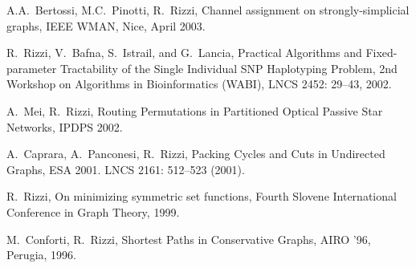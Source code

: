 \begin{etaremune}
\vspace{-1.8mm}
  \item {A.A.~Bertossi, M.C.~Pinotti, R.~Rizzi},
   \newblock Channel assignment on strongly-simplicial graphs,
   \newblock IEEE WMAN,
   \newblock Nice, April 2003.

\vspace{-1.8mm}
  \item {R.~Rizzi, V.~Bafna, S.~Istrail, and G.~Lancia},
   \newblock Practical Algorithms and Fixed-parameter Tractability
   \newblock of the Single Individual SNP Haplotyping Problem,
   \newblock 2nd Workshop on Algorithms in Bioinformatics (WABI),
   \newblock LNCS 2452: 29--43, 2002.

\vspace{-1.8mm}
  \item {A.~Mei, R.~Rizzi},
   \newblock Routing Permutations in Partitioned Optical Passive Star Networks,
   \newblock IPDPS 2002.

\vspace{-1.8mm}
  \item {A.~Caprara, A.~Panconesi, R.~Rizzi},
   \newblock  Packing Cycles and Cuts in Undirected Graphs,
   \newblock ESA 2001.
   \newblock LNCS 2161: 512--523 (2001).

\vspace{-1.8mm}
  \item {R.~Rizzi},
   \newblock On minimizing symmetric set functions,
   \newblock Fourth Slovene International Conference
             in Graph Theory, 1999.

\vspace{-1.8mm}
  \item {M.~Conforti, R.~Rizzi},
   \newblock Shortest Paths in Conservative Graphs,
   \newblock AIRO '96, Perugia, 1996.

\end{etaremune}
